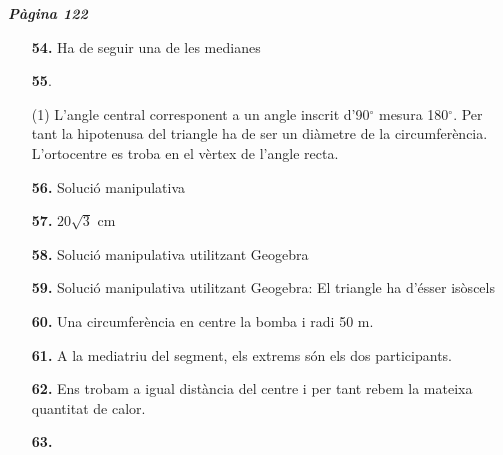\documentclass[a4paper, pdf, twoside]{book}
\begin{document}
\begin{multicols}{2}
{\textbf{\em Pàgina 122}} \hrulefill
\begin{enumerate}
\vspace{0.25cm}
\item[\fontfamily{phv}\selectfont\color{blue}\textbf{54. }] 
Ha de seguir una de les medianes
 \end{enumerate}
\begin{enumerate}
\vspace{0.25cm}



 \item[\fontfamily{phv}\selectfont\color{blue}\textbf{55}. ] 
 \begin{tasks}[column-sep=1em, item-indent=1.3333em](1)
	 \task*  L'angle central corresponent a un angle inscrit d'90$^\circ $ mesura 180$^\circ $. Per tant la hipotenusa del triangle ha de ser un diàmetre de la circumferència.
	 \task* L'ortocentre es troba en el vèrtex de l'angle recta.
\end{tasks}
\vspace{0.25cm}
\item[\fontfamily{phv}\selectfont\color{blue}\textbf{56. }] 
Solució manipulativa
\vspace{0.25cm}
\item[\fontfamily{phv}\selectfont\color{blue}\textbf{57. }] 
$20\sqrt {3}$ cm
\vspace{0.25cm}
\item[\fontfamily{phv}\selectfont\color{blue}\textbf{58. }] 
Solució manipulativa utilitzant Geogebra
\vspace{0.25cm}
\item[\fontfamily{phv}\selectfont\color{blue}\textbf{59. }] 
Solució manipulativa utilitzant Geogebra: El triangle ha d'ésser isòscels
\vspace{0.25cm}
\item[\fontfamily{phv}\selectfont\color{blue}\textbf{60. }] 
Una circumferència en centre la bomba i radi 50 m.
\vspace{0.25cm}
\item[\fontfamily{phv}\selectfont\color{blue}\textbf{61. }] 
A la mediatriu del segment, els extrems són els dos participants.
\vspace{0.25cm}
\item[\fontfamily{phv}\selectfont\color{blue}\textbf{62. }] 
Ens trobam a igual distància del centre i per tant rebem la mateixa quantitat de calor.
\vspace{0.25cm}
\item[\fontfamily{phv}\selectfont\color{blue}\textbf{63. }] 

\end{enumerate}
\end{multicols}
\end{document}
